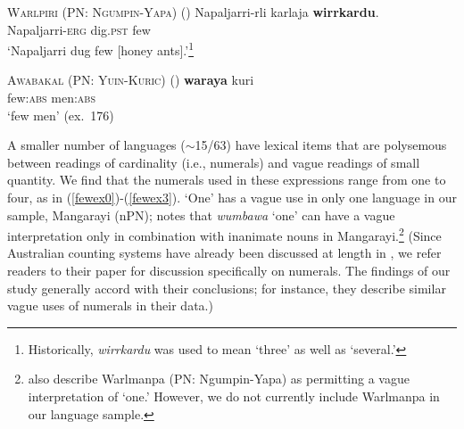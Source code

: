 \documentclass[12pt,egregdoesnotlikesansseriftitles]{scrartcl}
\begin{document}
\begin{exe}
  \ex \textsc{Warlpiri (PN: Ngumpin-Yapa)} \hfill(\citealt[9]{bowler17})
  \gll Napaljarri-rli karlaja \textbf{wirrkardu}.\\
  Napaljarri-\textsc{erg} dig.\textsc{pst} few\\
  \glt `Napaljarri dug few [honey ants].'\footnote{Historically, \textit{wirrkardu} was used to mean `three' as well as `several.'} \label{warlpiriseveral1}
  
  \ex \textsc{Awabakal (PN: Yuin-Kuric)} \hfill(\citealt{lissarrague06})
  \gll \textbf{waraya}   kuri\\
    few:\textsc{abs} men:\textsc{abs}\\
    `few men' (ex.\ 176)\label{awabakalseveral1}
\end{exe}

A smaller number of languages ($\sim$15/63) have lexical items that are polysemous between readings of cardinality (i.e., numerals) and vague readings of small quantity.  We find that the numerals used in these expressions range from one to four, as in (\ref{fewex0})-(\ref{fewex3}). `One' has a vague use in only one language in our sample, Mangarayi (nPN); \citet[93]{merlan89} notes that \textit{wumbawa} `one' can have a vague interpretation only in combination with inanimate nouns in Mangarayi.\footnote{\citet[143]{bowernzentz12} also describe Warlmanpa (PN: Ngumpin-Yapa) as permitting a vague interpretation of `one.' However, we do not currently include Warlmanpa in our language sample.} (Since Australian counting systems have already been discussed at length in \cite{bowernzentz12}, we refer readers to their paper for discussion specifically on numerals. The findings of our study generally accord with their conclusions; for instance, they describe similar vague uses of numerals in their data.)

\end{document}
